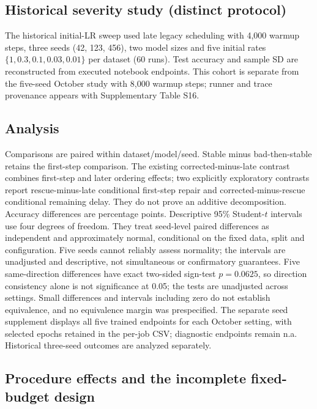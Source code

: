 \documentclass[referee,pdflatex,sn-mathphys-num]{sn-jnl}
\begin{document}
\subsection{Historical severity study (distinct protocol)}\label{historical-severity-study-distinct-protocol}

The historical initial-LR sweep used late legacy scheduling with 4,000 warmup steps, three seeds (42, 123, 456), two model sizes and five initial rates \(\{1,0.3,0.1,0.03,0.01\}\) per dataset (60 runs). Test accuracy and sample SD are reconstructed from executed notebook endpoints. This cohort is separate from the five-seed October study with 8,000 warmup steps; runner and trace provenance appears with Supplementary Table S16.

\subsection{Analysis}\label{analysis}

Comparisons are paired within dataset/model/seed. Stable minus bad-then-stable retains the first-step comparison. The existing corrected-minus-late contrast combines first-step and later ordering effects; two explicitly exploratory contrasts report rescue-minus-late conditional first-step repair and corrected-minus-rescue conditional remaining delay. They do not prove an additive decomposition. Accuracy differences are percentage points. Descriptive 95\% Student-\(t\) intervals use four degrees of freedom. They treat seed-level paired differences as independent and approximately normal, conditional on the fixed data, split and configuration. Five seeds cannot reliably assess normality; the intervals are unadjusted and descriptive, not simultaneous or confirmatory guarantees. Five same-direction differences have exact two-sided sign-test \(p=0.0625\), so direction consistency alone is not significance at 0.05; the tests are unadjusted across settings. Small differences and intervals including zero do not establish equivalence, and no equivalence margin was prespecified. The separate seed supplement displays all five trained endpoints for each October setting, with selected epochs retained in the per-job CSV; diagnostic endpoints remain n.a. Historical three-seed outcomes are analyzed separately.

\subsection{Procedure effects and the incomplete fixed-budget design}\label{procedure-effects-and-the-incomplete-fixed-budget-design}
\end{document}
